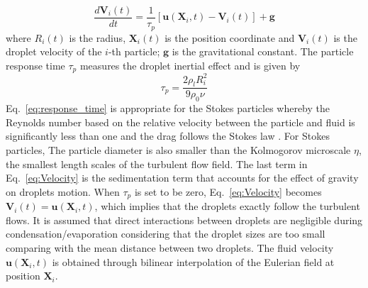 \documentclass[draft,jgrga]{AGUTeX}
\newcommand{\Eq}[1]{Eq.~\eqref{#1}} \newcommand{\Fig}[1]{Figure~\ref{#1}}
\begin{document}
\begin{article}
\begin{equation}
\frac{d\mathbf{V}_i(t)}{dt}=\frac{1}{\tau_{p}}[\mathbf{u}(\mathbf{X}_i,t)-\mathbf{V}_i(t)]+\mathbf{g}\label{eq:Velocity}
\end{equation}
where $R_i(t)$ is the radius, $\mathbf{X}_i(t)$ is the position
coordinate and $\mathbf{V}_i(t)$ is the droplet velocity of the $i$-th particle; $\mathbf{g}$ is the gravitational constant.
The particle response time $\tau_p$ measures the droplet inertial effect and is given by
\begin{equation}
\tau_{p}=\frac{2\rho_{l}R_i^{2}}{9\rho_{0}\nu}
\label{eq:response_time}
\end{equation}
\Eq{eq:response_time} is appropriate for the Stokes particles whereby the Reynolds number 
based on the relative velocity between the particle and fluid is significantly less than one and the 
drag follows the Stokes law \cite{Eaton94}. For Stokes particles, The particle diameter is also smaller than the Kolmogorov microscale $\eta$, the smallest length scales of the turbulent flow field.
The last term in \Eq{eq:Velocity} is the sedimentation term that accounts for the effect of 
gravity on droplets motion. When $\tau_{p}$ is set to be zero, \Eq{eq:Velocity} becomes $\mathbf{V}_i(t)=\mathbf{u}(\mathbf{X}_i,t)$, 
which implies that the droplets exactly follow the turbulent flows. 
It is assumed that direct interactions between droplets are negligible during 
condensation/evaporation considering that the droplet sizes are too small comparing 
with the mean distance between two droplets. The fluid velocity $\mathbf{u}(\mathbf{X}_i, t)$ 
is obtained through bilinear interpolation of the Eulerian field at position $\mathbf{X}_i$.


\end{article}
\end{document}
